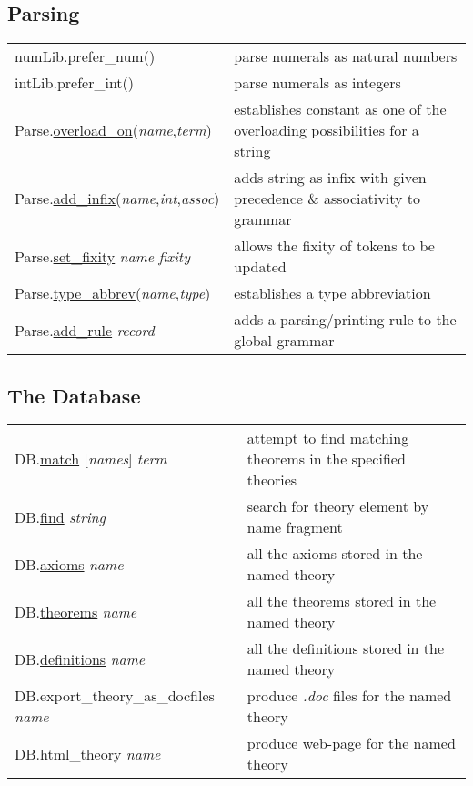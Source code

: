 \documentclass[landscape,10pt]{article}
\newcommand{\hol}[2]{{\sffamily #1.\href{#1.#2.html}{#2}}}
\newcommand{\holnoref}[2]{{\sffamily #1.#2}}
\newcommand{\var}[1]{{\emph{#1}}}
\begin{document}
\begin{multicols}{2}
\subsection*{Parsing}
\begin{tabular}{ll}
\holnoref{numLib}{prefer_num}() & parse numerals as natural numbers \\
\holnoref{intLib}{prefer_int}() & parse numerals as integers \\
\hol{Parse}{overload_on}(\var{name},\var{term}) & establishes constant as one of the overloading possibilities for a string \\
\hol{Parse}{add_infix}(\var{name},\var{int},\var{assoc}) & adds string as infix with given precedence \& associativity to grammar \\
\hol{Parse}{set_fixity} \var{name} \var{fixity} & allows the fixity of tokens to be updated \\
\hol{Parse}{type_abbrev}(\var{name},\var{type}) & establishes a type abbreviation \\
\hol{Parse}{add_rule} \var{record} & adds a parsing/printing rule to the global grammar \\
\end{tabular}
\subsection*{The Database}
\begin{tabular}{ll}
\hol{DB}{match} [\var{names}] \var{term} & attempt to find matching theorems in the specified theories \\
\hol{DB}{find} \var{string} & search for theory element by name fragment \\
\hol{DB}{axioms} \var{name} & all the axioms stored in the named theory \\
\hol{DB}{theorems} \var{name} & all the theorems stored in the named theory \\
\hol{DB}{definitions} \var{name} & all the definitions stored in the named theory \\
\holnoref{DB}{export_theory_as_docfiles} \var{name} & produce \emph{.doc} files for the named theory \\
\holnoref{DB}{html_theory} \var{name} & produce web-page for the named theory \\
\end{tabular}

\end{multicols}
\end{document}
